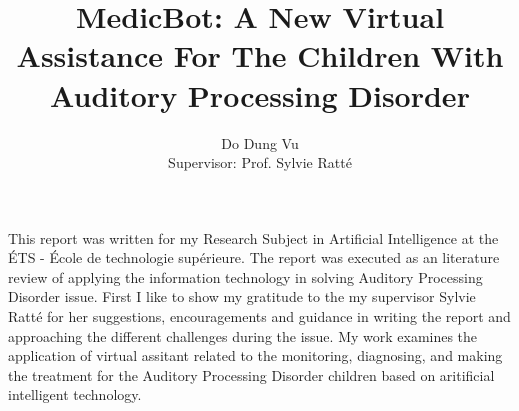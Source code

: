 \documentclass[letterpaper%
, twoside%
, 12pt%
,these%
, english%
,creativecommons,hyperref%
]{thETS}
\title{MedicBot: A New Virtual Assistance For The
	Children With Auditory Processing Disorder}
\author{Do Dung Vu \\ Supervisor: Prof. Sylvie Ratté}
\begin{document}

\maketitle



\begin{foreword}

This report was written for my Research Subject in Artificial Intelligence at the ÉTS - École
de technologie supérieure. The report was executed as an literature review of applying the
information technology in solving Auditory Processing Disorder issue. First I like to show
my gratitude to the my supervisor Sylvie Ratté for her suggestions, encouragements and guidance
in writing the report and approaching the different challenges during the issue. My work
examines the application of virtual assitant related to the monitoring, diagnosing, and making
the treatment for the Auditory Processing Disorder children based on aritificial intelligent
technology.
\end{foreword}








\end{document}
